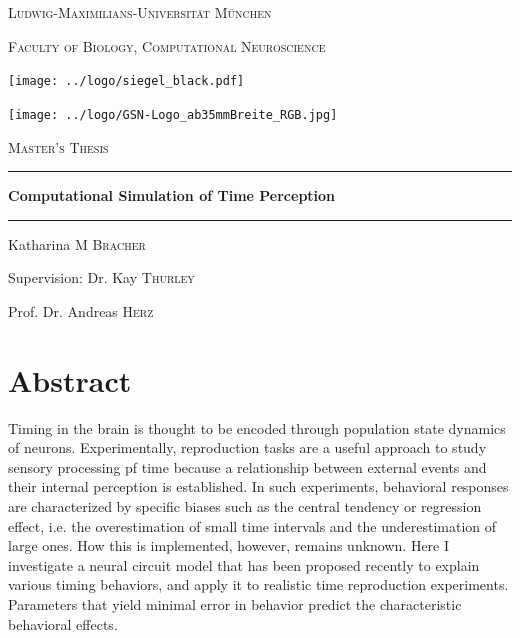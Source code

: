 \documentclass[10pt]{article}
\begin{document}

\begin{titlepage}
	\centering
	{\scshape\LARGE Ludwig-Maximilians-Universität München \par}
	{\scshape\large Faculty of Biology, Computational Neuroscience \par}
	\vspace{0.7cm}
	\texttt{[image: ../logo/siegel\_black.pdf]}\par
	\texttt{[image: ../logo/GSN-Logo\_ab35mmBreite\_RGB.jpg]}\par
	\vspace{0.5cm}

	{\scshape\LARGE Master's Thesis}
	\rule{\textwidth}{1.pt}
	{\huge\bfseries Computational Simulation of Time Perception \par}
	\rule{\textwidth}{1.pt}
	\vspace{0.5cm}

	{\Large Katharina \textsc{M Bracher} \par}
	\vspace{0.7cm}

	{\large Supervision: Dr. Kay \textsc{Thurley} \par}
	{\large Prof. Dr. Andreas \textsc{Herz} \par}
\end{titlepage}


\normalsize

\section*{Abstract}

Timing in the brain is thought to be encoded through population state dynamics of neurons.
Experimentally, reproduction tasks are a useful approach to study sensory processing pf time because a relationship between external events and their internal perception is established.
In such experiments, behavioral responses are characterized by specific biases such as the central tendency or regression effect, i.e. the overestimation of small time intervals and the underestimation of large ones.
How this is implemented, however, remains unknown.
Here I investigate a neural circuit model that has been proposed recently to explain various timing behaviors, and apply it to realistic time reproduction experiments.  Parameters that yield minimal error in behavior predict the characteristic behavioral effects. 
\end{document}
